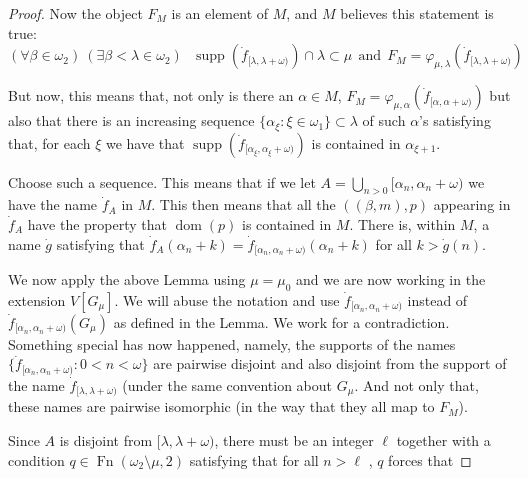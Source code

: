 \documentclass[11pt]{article}
\begin{document}
\begin{proof}
        Now the object $F_M$ is an
        element of $M$, and $M$ believes this statement is true:
        $$
        (\forall \beta\in\omega_2)~ (\exists \beta<\lambda\in \omega_2)~~~
        \operatorname{supp}(\dot f_{[\lambda,\lambda+\omega)})
        \cap \lambda\subset \mu \ \ \mbox{and}\ \
        F_M = \varphi_{\mu,\lambda}(\dot f_{[\lambda,\lambda+\omega)})$$


        But now, this  means that,
        not only is there  an $\alpha\in M$,
        $ F_M = \varphi_{\mu,\alpha}(\dot f_{[\alpha,\alpha+\omega)})$
        but also that there is an increasing sequence
         $\{\alpha_\xi : \xi  \in \omega_1\}\subset \lambda$ of
         such $\alpha$'s satisfying that, for each $\xi$
        we have that $\operatorname{supp}(\dot
        f_{[\alpha_\xi,\alpha_\xi+\omega)})$ is contained in $\alpha_{\xi+1}$.

        Choose such a sequence.
         This means that if we let $A = \bigcup_{n>0} [\alpha_n,\alpha_n+\omega)$ we
         have the name $\dot f_A$ in $M$. This then means that all
         the $( (\beta,m) , p)$ appearing in $\dot f_A$ have the property
         that $\mathop{dom}(p)$ is contained in $M$.
        There is, within $M$, a name $\dot g$ satisfying that
         $\dot f_A(\alpha_n+k) = \dot f_{[\alpha_n,\alpha_n+\omega)}(\alpha_n+k)$
        for all $k >\dot g(n)$.

        \bigskip

        We now apply the above Lemma using $\mu = \mu_0$ and we are now
        working in the extension $V[G_\mu]$. We will abuse the notation
        and use $\dot f_{[\alpha_n,\alpha_n+\omega)}$ instead of
          $\dot f_{[\alpha_n,\alpha_n+\omega)}(G_{\mu})$ as defined in
          the Lemma.
        We work for a contradiction. Something special has now happened,
         namely,  the supports of the names $\{
        \dot f_{[\alpha_n, \alpha_n+\omega)} :  0< n<\omega\}$ are pairwise disjoint
        and also disjoint from the support of the name
         $\dot f_{[\lambda,\lambda+\omega)}$ (under the same convention about
         $G_\mu$.  And not only that, these names are pairwise isomorphic (in
         the way that they all map to $F_M$).


        \bigskip

        Since $A$ is disjoint from $[\lambda,\lambda+\omega)$,
        there must be an integer $\ell$
        together with a condition
         $q\in \mathop{Fn}(\omega_2\setminus \mu,2)$ satisfying that for all
         $n>\ell$ , $q$ forces that


\end{proof}
\end{document}
